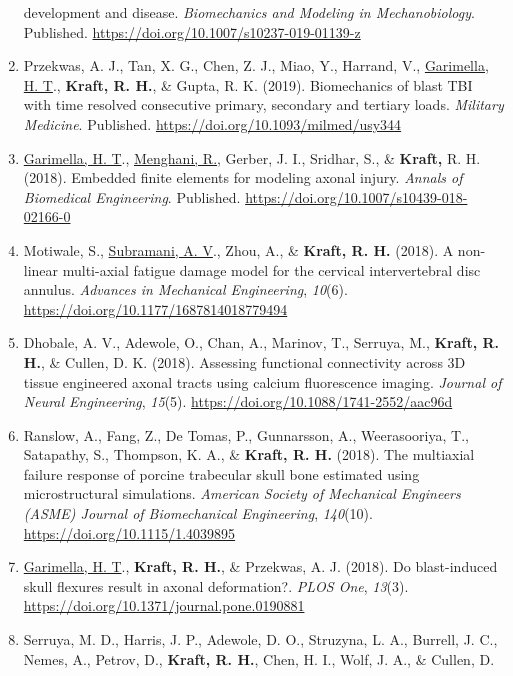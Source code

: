 \documentclass[11pt]{article}
\begin{document}
\begin{enumerate}
  development and disease. 
\emph{Biomechanics and Modeling in
  Mechanobiology}. 
Published.
  \url{https://doi.org/10.1007/s10237-019-01139-z}
\item
  Przekwas, A. 
J., Tan, X. 
G., Chen, Z. 
J., Miao, Y., Harrand, V.,
  \underline{Garimella, H. 
T}., \textbf{\textbf{Kraft,} R. 
H.}, \& Gupta, R. 
K. 
(2019). 
Biomechanics
  of blast TBI with time resolved consecutive primary, secondary and
  tertiary loads. 
\emph{Military Medicine}. 
Published.
  \url{https://doi.org/10.1093/milmed/usy344}
\item
  \underline{Garimella, H. 
T}., \underline{Menghani, R.}, Gerber, J. 
I., Sridhar, S., \& \textbf{Kraft,}
  R. 
H. 
(2018). 
Embedded finite elements for modeling axonal injury.
  \emph{Annals of Biomedical Engineering}. 
Published.
  \url{https://doi.org/10.1007/s10439-018-02166-0}
\item
  Motiwale, S., \underline{Subramani, A. 
V}., Zhou, A., \& \textbf{\textbf{Kraft,} R. 
H.} (2018). 
A
  non-linear multi-axial fatigue damage model for the cervical
  intervertebral disc annulus. 
\emph{Advances in Mechanical
  Engineering}, \emph{10}(6).
  \url{https://doi.org/10.1177/1687814018779494}
\item
  Dhobale, A. 
V., Adewole, O., Chan, A., Marinov, T., Serruya, M.,
  \textbf{\textbf{Kraft,} R. 
H.}, \& Cullen, D. 
K. 
(2018). 
Assessing functional
  connectivity across 3D tissue engineered axonal tracts using calcium
  fluorescence imaging. 
\emph{Journal of Neural Engineering},
  \emph{15}(5). 
\url{https://doi.org/10.1088/1741-2552/aac96d}
\item
  Ranslow, A., Fang, Z., De Tomas, P., Gunnarsson, A., Weerasooriya, T.,
  Satapathy, S., Thompson, K. 
A., \& \textbf{\textbf{Kraft,} R. 
H.} (2018). 
The multiaxial
  failure response of porcine trabecular skull bone estimated using
  microstructural simulations. 
\emph{American Society of Mechanical
  Engineers (ASME) Journal of Biomechanical Engineering},
  \emph{140}(10). 
\url{https://doi.org/10.1115/1.4039895}
\item
  \underline{Garimella, H. 
T}., \textbf{\textbf{Kraft,} R. 
H.}, \& Przekwas, A. 
J. 
(2018). 
Do
  blast-induced skull flexures result in axonal deformation?. 
\emph{PLOS
  One}, \emph{13}(3). 
\url{https://doi.org/10.1371/journal.pone.0190881}
\item
  Serruya, M. 
D., Harris, J. 
P., Adewole, D. 
O., Struzyna, L. 
A.,
  Burrell, J. 
C., Nemes, A., Petrov, D., \textbf{\textbf{Kraft,} R. 
H.}, Chen, H. 
I.,
  Wolf, J. 
A., \& Cullen, D. 

\end{enumerate}
\end{document}
